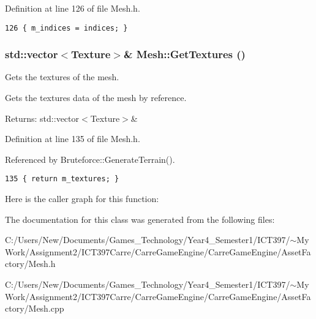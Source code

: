 Definition at line 126 of file Mesh.h.

\begin{Code}\begin{verbatim}126 { m_indices = indices; }
\end{verbatim}
\end{Code}


\hypertarget{class_mesh_95ffc7584eff5e065901637728e0f66a}{
\subsubsection[GetTextures]{\setlength{\rightskip}{0pt plus 5cm}std::vector$<$Texture$>$\& Mesh::GetTextures ()}}
\label{class_mesh_95ffc7584eff5e065901637728e0f66a}


Gets the textures of the mesh. 

Gets the textures data of the mesh by reference.

\begin{Desc}
\item[Returns:]std::vector$<$Texture$>$\& \end{Desc}


Definition at line 135 of file Mesh.h.

Referenced by Bruteforce::GenerateTerrain().

\begin{Code}\begin{verbatim}135 { return m_textures; }
\end{verbatim}
\end{Code}




Here is the caller graph for this function:

The documentation for this class was generated from the following files:\begin{CompactItemize}
\item 
C:/Users/New/Documents/Games\_\-Technology/Year4\_\-Semester1/ICT397/$\sim$My Work/Assignment2/ICT397Carre/CarreGameEngine/CarreGameEngine/AssetFactory/Mesh.h\item 
C:/Users/New/Documents/Games\_\-Technology/Year4\_\-Semester1/ICT397/$\sim$My Work/Assignment2/ICT397Carre/CarreGameEngine/CarreGameEngine/AssetFactory/Mesh.cpp\end{CompactItemize}
